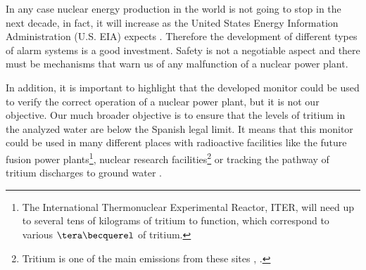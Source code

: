 In any case nuclear energy production in the world is not going to stop in the next decade, in fact, it will increase as the United States Energy Information Administration (U.S. EIA) expects \cite{EIAOutlook}. Therefore the development of  different types of alarm systems is a good investment. Safety is not a negotiable aspect and there must be mechanisms that warn us of any malfunction of a nuclear power plant. 

In addition, it is important to highlight that the developed monitor could be used to verify the correct operation of a nuclear power plant, but it is not our objective. Our much broader objective is to ensure that the levels of tritium in the analyzed water are below the Spanish legal limit. It means that this monitor could be used in many different places with radioactive facilities like the future fusion power plants\footnote{The International Thermonuclear Experimental Reactor, ITER, will need up to several tens of kilograms of tritium to function, which correspond to various $\tera\becquerel$ of tritium.}, nuclear research facilities\footnote{Tritium is one of the main emissions from these sites \cite{FERMILAB}, \cite{BrookHavenNationalLaboratory}.} or tracking the pathway of tritium discharges to ground water \cite{TrackingTritium}. 


